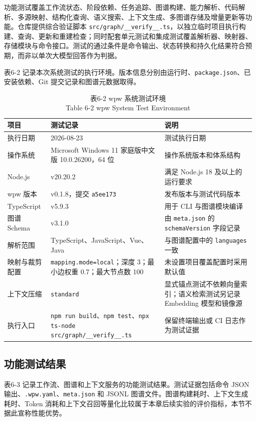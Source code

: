功能测试覆盖工作流状态、阶段依赖、任务追踪、图谱构建、能力解析、代码解析、多源映射、结构化查询、语义搜索、上下文生成、多图谱存储及增量更新等功能。仓库提供综合验证脚本 \texttt{src/graph/\_\_verify\_\_.ts}，以独立临时项目执行构建、查询、更新和重建检查；同时配套单元测试和集成测试覆盖解析器、映射器、存储模块与命令接口。测试的通过条件是命令输出、状态转换和持久化结果符合预期，而非以单次大模型回答作为判据。

表6-2 记录本次系统测试的执行环境。版本信息分别由运行时、\texttt{package.json}、已安装依赖、Git 提交记录和图谱元数据取得。

\begin{table}[htbp]
\centering
\small
\caption{表6-2 wpw 系统测试环境\\Table 6-2 wpw System Test Environment}
\begin{tabularx}{\textwidth}{|X|X|X|}
\hline
\textbf{项目} & \textbf{测试记录} & \textbf{说明} \\
\hline
执行日期 & 2026-08-23 & 测试执行日期 \\
操作系统 & Microsoft Windows 11 家庭版中文版 10.0.26200，64 位 & 操作系统版本和体系结构 \\
Node.js & v20.20.2 & 满足 Node.js 18 及以上的运行要求 \\
wpw 版本 & v0.1.8，提交 \texttt{a5ee173} & 发布版本与测试代码版本 \\
TypeScript & v5.9.3 & 用于 CLI 与图谱模块编译 \\
图谱 Schema & v3.1.0 & 由 \texttt{meta.json} 的 \texttt{schemaVersion} 字段记录 \\
解析范围 & TypeScript、JavaScript、Vue、Java & 与图谱配置中的 \texttt{languages} 一致 \\
映射与裁剪配置 & \texttt{mapping.mode=local}；深度 3；最小边权重 0.7；最大节点数 100 & 未设置项目覆盖配置时采用默认值 \\
上下文压缩 & \texttt{standard} & 显式锚点测试不依赖向量索引；语义检索测试另记录 Embedding 模型和镜像源 \\
执行入口 & \texttt{npm run build}、\texttt{npm test}、\texttt{npx ts-node src/graph/\_\_verify\_\_.ts} & 保留终端输出或 CI 日志作为测试证据 \\
\hline
\end{tabularx}
\end{table}


\subsection{功能测试结果}
表6-3 记录工作流、图谱和上下文服务的功能测试结果。测试证据包括命令 JSON 输出、\texttt{.wpw.yaml}、\texttt{meta.json} 和 JSONL 图谱文件。图谱构建耗时、上下文生成耗时、Token 消耗和上下文召回等量化比较属于本章后续实验的评价指标，本节不据此宣称性能优势。

